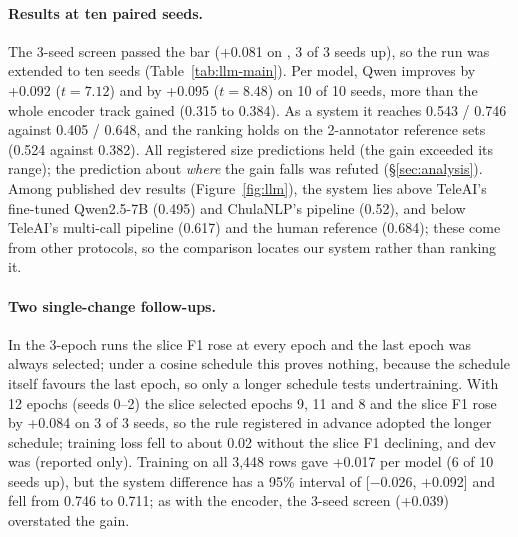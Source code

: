 \paragraph{Results at ten paired seeds.}
The 3-seed screen passed the bar (+0.081 on \Stwo{}, 3 of 3 seeds up), so the run was extended to ten seeds (Table~\ref{tab:llm-main}).
Per model, Qwen improves \Stwo{} by +0.092 ($t=7.12$) and \Sone{} by +0.095 ($t=8.48$) on 10 of 10 seeds, more than the whole encoder track gained (0.315 to 0.384).
As a system it reaches 0.543 / 0.746 against 0.405 / 0.648, and the ranking holds on the 2-annotator reference sets (0.524 against 0.382).
All registered size predictions held (the \Sone{} gain exceeded its range); the prediction about \emph{where} the gain falls was refuted (\S\ref{sec:analysis}).
Among published dev results (Figure~\ref{fig:llm}), the system lies above TeleAI's fine-tuned Qwen2.5-7B (0.495) and ChulaNLP's pipeline (0.52), and below TeleAI's multi-call pipeline (0.617) and the human reference (0.684); these come from other protocols, so the comparison locates our system rather than ranking it.

\FigureLLM

\paragraph{Two single-change follow-ups.}
In the 3-epoch runs the slice F1 rose at every epoch and the last epoch was always selected; under a cosine schedule this proves nothing, because the schedule itself favours the last epoch, so only a longer schedule tests undertraining.
With 12 epochs (seeds 0--2) the slice selected epochs 9, 11 and 8 and the slice F1 rose by +0.084 on 3 of 3 seeds, so the rule registered in advance adopted the longer schedule; training loss fell to about 0.02 without the slice F1 declining, and dev \Stwo{} was  (reported only).
Training on all 3,448 rows gave +0.017 per model (6 of 10 seeds up), but the system difference has a 95\% interval of [$-$0.026, +0.092] and \Sone{} fell from 0.746 to 0.711; as with the encoder, the 3-seed screen (+0.039) overstated the gain.
